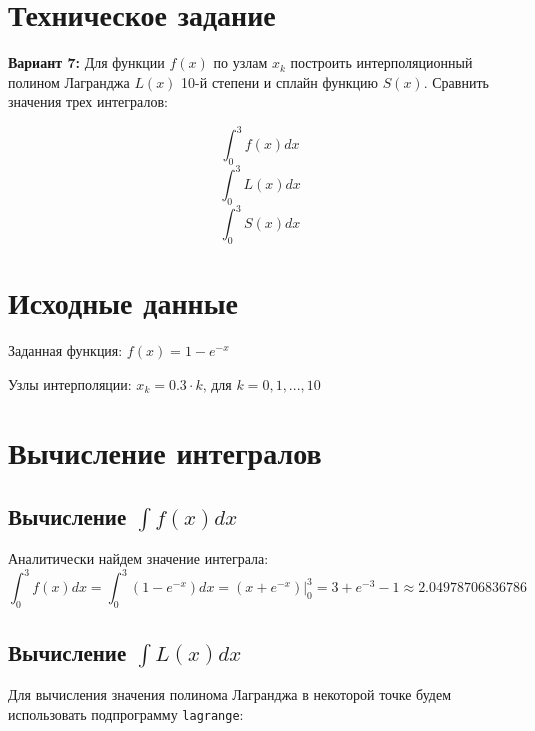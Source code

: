 





\section{Техническое задание}

\textbf{Вариант 7:} Для функции $f(x)$ по узлам $x_k$ построить интерполяционный полином Лагранджа $L(x)$ 10-й степени и сплайн функцию $S(x)$. Сравнить значения трех интегралов:

\begin{multicols}{3}
	\noindent 
	\[\int_0^3 f(x)dx\]
	\[\int_0^3 L(x)dx\]
	\[\int_0^3 S(x)dx\]
\end{multicols}

\section{Исходные данные}

Заданная функция: $f(x) = 1 - e^{-x}$

\vspace{0.5cm}

Узлы интерполяции: $x_k = 0.3 \cdot k\text{, для }k = 0, 1, ..., 10$

\section{Вычисление интегралов}

\subsection{Вычисление $\int f(x)dx$}

Аналитически найдем значение интеграла:
\vspace{-0.2cm}
\[
\int_0^3 f(x)dx = \int_0^3 \left(1 - e^{-x}\right) dx = \left.\left( x + e^{-x} \right)\right\vert_0^3 = 3 + e^{-3} - 1 \approx 2.04978706836786
\]

\subsection{Вычисление $\int L(x)dx$}

\makeatletter
\def\lst@PlaceNumber{\llap{\normalfont
                \lst@numberstyle{\the\lst@lineno}\kern\lst@numbersep}}
\makeatother

Для вычисления значения полинома Лагранджа в некоторой точке будем использовать подпрограмму \texttt{lagrange}:

